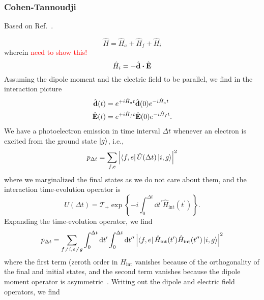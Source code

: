 \subsubsection{Cohen-Tannoudji}

Based on Ref.~\cite[p.~128]{Cohen1992}.

\begin{equation}
	\hat{H}
	=
	\hat{H}_a
	+
	\hat{H}_f
	+
	\hat{H}_i
\end{equation}
wherein \textcolor{red}{need to show this!}
\begin{equation}
	\hat{H}_i
	=
	-
	\hat{\vb{d}}
	\vdot
	\hat{\vb{E}}
\end{equation}
Assuming the dipole moment and the electric field to be parallel, we find in the interaction picture
\begin{align}
	\hat{\vb{d}}(t)
	&=
	e^{+i\hat{H}_at}
	\hat{\vb{d}}(0)
	e^{-i\hat{H}_at}
	\\
	\hat{\vb{E}}(t)
	&=
	e^{+i\hat{H}_ft}
	\hat{\vb{E}}(0)
	e^{-i\hat{H}_ft}
	.
\end{align}
We have a photoelectron emission in time interval $\Delta t$ whenever an electron is excited from the ground state $\ket{g}$, i.e.,
\begin{equation}
	p_{\Delta t}
	=
	\sum_{f,e}
	\abs{\bra{f,e}\hat{U}(\Delta t)\ket{i,g}}^2
\end{equation}
where we marginalized the final states as we do not care about them, and the interaction time-evolution operator is
\begin{equation}
	\hat{U}(\Delta t)
	=
	\mathcal{T}_+
	\exp\left\{
		-i\int_0^{\Delta t}\dd{t^\prime}
		\hat{H}_\text{int}(t^\prime)
	\right\}
	.
\end{equation}
Expanding the time-evolution operator, we find
\begin{equation}
	p_{\Delta t}
	=
	\sum_{f\neq i,e\neq g}
	\int_0^{\Delta t}\dd{t^\prime}
	\int_0^{\Delta t}\dd{t^{\prime\prime}}
	\abs{\bra{f,e}\hat{H}_\text{int}(t^\prime)\hat{H}_\text{int}(t^{\prime\prime})\ket{i,g}}^2
\end{equation}
where the first term (zeroth order in $\hat{H}_\text{int}$ vanishes because of the orthogonality of the final and initial states, and the second term vanishes because the dipole moment operator is asymmetric~\cite[p.~131]{Cohen1992}.
Writing out the dipole and electric field operators, we find
